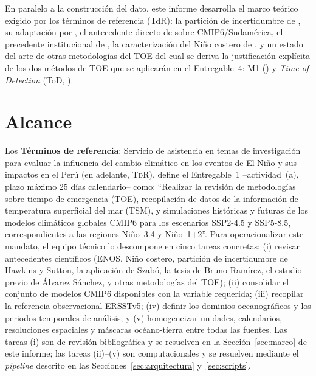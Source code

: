 \documentclass[11pt,a4paper]{article}
\begin{document}
En paralelo a la construcci\'on del dato, este informe desarrolla el marco te\'orico exigido por los t\'erminos de referencia (TdR): la partici\'on de incertidumbre de \citet{hawkins2012}, su adaptaci\'on por \citet{szabo2016}, el antecedente directo de \citet{bruno2023} sobre CMIP6/Sudam\'erica, el precedente institucional de \citet{alvarez2024}, la caracterizaci\'on del Ni\~no costero de \citet{takahashi2019}, y un estado del arte de otras metodolog\'ias del TOE del cual se deriva la justificaci\'on expl\'icita de los dos m\'etodos de TOE que se aplicar\'an en el Entregable~4: M1 (\citealp{szabo2016}) y \emph{Time of Detection} (ToD, \citealp{gopika2024}).

\section{Alcance}
\label{sec:alcance}

Los \textbf{Términos de referencia}: Servicio de asistencia en temas de investigación para evaluar la influencia del cambio climático en los eventos de El Niño y sus impactos en el Perú (en adelante, \textsc{TdR}), define el Entregable~1 --actividad~(a), plazo m\'aximo 25 d\'ias calendario-- como: ``Realizar la revisi\'on de metodolog\'ias sobre tiempo de emergencia (TOE), recopilaci\'on de datos de la informaci\'on de temperatura superficial del mar (TSM), y simulaciones hist\'oricas y futuras de los modelos clim\'aticos globales CMIP6 para los escenarios SSP2-4.5 y SSP5-8.5, correspondientes a las regiones Ni\~no~3.4 y Ni\~no~1+2''. Para operacionalizar este mandato, el equipo t\'ecnico lo descompone en cinco tareas concretas: (i) revisar antecedentes cient\'ificos (ENOS, Ni\~no costero, partici\'on de incertidumbre de Hawkins y Sutton, la aplicaci\'on de Szab\'o, la tesis de Bruno Ram\'irez, el estudio previo de \'Alvarez S\'anchez, y otras metodolog\'ias del TOE); (ii) consolidar el conjunto de modelos CMIP6 disponibles con la variable requerida; (iii) recopilar la referencia observacional ERSSTv5; (iv) definir los dominios oceanogr\'aficos y los periodos temporales de an\'alisis; y (v) homogeneizar unidades, calendarios, resoluciones espaciales y m\'ascaras oc\'eano-tierra entre todas las fuentes. Las tareas (i) son de revisi\'on bibliogr\'afica y se resuelven en la Secci\'on~\ref{sec:marco} de este informe; las tareas (ii)--(v) son computacionales y se resuelven mediante el \emph{pipeline} descrito en las Secciones~\ref{sec:arquitectura} y~\ref{sec:scripts}.
\end{document}

